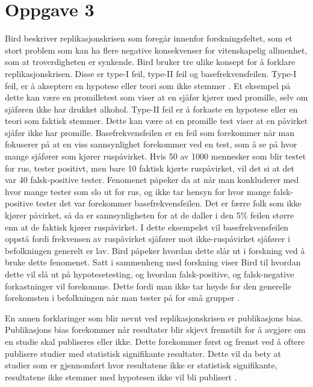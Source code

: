 \documentclass[
]{book}
\begin{document}
\hypertarget{oppgave-3}{%
\section{Oppgave 3}\label{oppgave-3}}

Bird beskriver replikasjonskrisen som foregår innenfor forskningsfeltet, som et stort problem som kan ha flere negative konsekvenser for vitenskapelig allmenhet, som at troverdigheten er synkende. Bird bruker tre ulike konsept for å forklare replikasjonskrisen. Disse er type-I feil, type-II feil og basefrekvensfeilen. Type-I feil, er å akseptere en hypotese eller teori som ikke stemmer \citep{bird2020}. Et eksempel på dette kan være en promilletest som viser at en sjåfør kjører med promille, selv om sjåføren ikke har drukket alkohol. Type-II feil er å forkaste en hypotese eller en teori som faktisk stemmer. Dette kan være at en promille test viser at en påvirket sjåfør ikke har promille. Basefrekvensfeilen er en feil som forekommer når man fokuserer på at en viss sannsynlighet forekommer ved en test, som å se på hvor mange sjåfører som kjører ruspåvirket. Hvis 50 av 1000 mennesker som blir testet for rus, tester positivt, men bare 10 faktisk kjørte ruspåvirket, vil det si at det var 40 falsk-positive tester. Fenomenet påpeker da at når man konkluderer med hvor mange tester som slo ut for rus, og ikke tar hensyn for hvor mange falsk-positive tester det var forekommer basefrekvensfeilen. Det er færre folk som ikke kjører påvirket, så da er sannsynligheten for at de daller i den 5\% feilen større enn at de faktisk kjører ruspåvirket. I dette eksempelet vil basefrekvensfeilen oppstå fordi frekvensen av ruspåvirket sjåfører mot ikke-ruspåvirket sjåfører i befolkningen generelt er lav. Bird påpeker hvordan dette slår ut i forskning ved å bruke dette fenomenet. Satt i sammenheng med forskning viser Bird til hvordan dette vil slå ut på hypotesetesting, og hvordan falsk-positive, og falsk-negative forkastninger vil forekomme. Dette fordi man ikke tar høyde for den generelle forekomsten i befolkningen når man tester på for små grupper \citep{bird2020}.

En annen forklaringer som blir nevnt ved replikasjonskrisen er publikasjons bias. Publikasjons bias forekommer når resultater blir skjevt fremstilt for å avgjøre om en studie skal publiseres eller ikke. Dette forekommer først og fremst ved å oftere publisere studier med statistisk signifikante resultater. Dette vil da bety at studier som er gjennomført hvor resultatene ikke er statistisk signifikante, resultatene ikke stemmer med hypotesen ikke vil bli publisert \citep{bird2020}.
\end{document}

